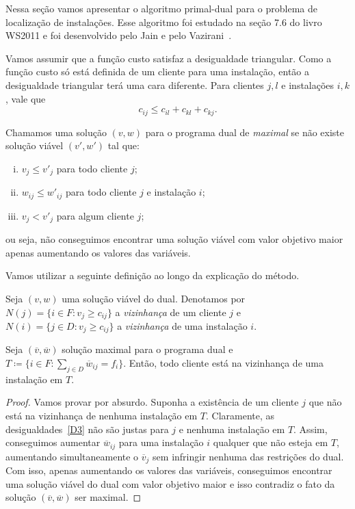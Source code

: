 Nessa seção vamos apresentar o algoritmo primal-dual para o problema de localização de instalações. Esse algoritmo foi estudado na seção 7.6 do livro WS2011 e foi desenvolvido pelo Jain e pelo Vazirani~\cite{JV}.

Vamos assumir que a função custo satisfaz a desigualdade triangular. Como a função custo só está definida de um cliente para uma instalação, então a desigualdade triangular terá uma cara diferente. Para clientes $j,l$ e  instalações $i,k$, vale que
\[c_{ij} \leq c_{il} + c_{kl} + c_{kj}.\]

Chamamos uma solução $(v,w)$ para o programa dual de \emph{maximal} se não existe solução viável $(v',w')$ tal que:
\begin{enumerate}[(i)]
    \item $v_j \leq v'_j$ para todo cliente $j$;
    \item $w_{ij} \leq w'_{ij}$ para todo cliente $j$ e instalação $i$;
    \item $v_j < v'_j$ para algum cliente $j$;
\end{enumerate}
ou seja, não conseguimos encontrar uma solução viável com valor objetivo maior apenas aumentando os valores das variáveis.

Vamos utilizar a seguinte definição ao longo da explicação do método.
\begin{definition}
    Seja $(v,w)$ uma solução viável do dual. Denotamos por $N(j) = \{i \in F:v_j \geq c_{ij}\}$ a \emph{vizinhança} de um cliente $j$ e $N(i) = \{j \in D:v_j \geq c_{ij}\}$ a \emph{vizinhança} de uma instalação $i$.
\end{definition}

\begin{theorem}
    Seja $(\overline v, \overline w)$ solução maximal para o programa dual e $T \coloneqq \{i \in F: \sum_{j \in D} \overline{w}_{ij} = f_i\}$. Então, todo cliente está na vizinhança de uma instalação em $T$.      
\end{theorem}
\begin{proof}
    Vamos provar por absurdo. Suponha a existência de um cliente $j$ que não está na vizinhança de nenhuma instalação em $T$. Claramente, as desigualdades~\eqref{D3} não são justas para $j$ e nenhuma instalação em $T$. Assim, conseguimos aumentar $\overline{w}_{ij}$ para uma instalação $i$ qualquer que não esteja em $T$, aumentando simultaneamente o $\overline{v}_j$ sem infringir nenhuma das restrições do dual. Com isso, apenas aumentando os valores das variáveis, conseguimos encontrar uma solução viável do dual com valor objetivo maior e isso contradiz o fato da solução $(\overline{v},\overline{w})$ ser maximal. 
\end{proof}

